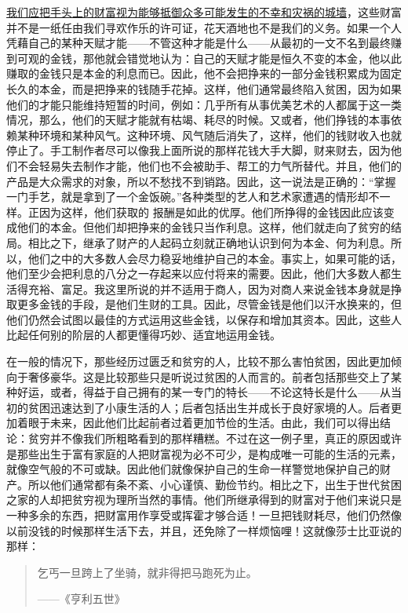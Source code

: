 \documentclass[12pt,oneside]{book}
\begin{document}
\uline{我们应把手头上的财富视为能够抵御众多可能发生的不幸和灾祸的城墙}，这些财富并不是一纸任由我们寻欢作乐的许可证，花天酒地也不是我们的义务。如果一个人凭藉自己的某种天赋才能——不管这种才能是什么——从最初的一文不名到最终赚到可观的金钱，那他就会错觉地认为：自己的天赋才能是恒久不变的本金，他以此赚取的金钱只是本金的利息而已。因此，他不会把挣来的一部分金钱积累成为固定长久的本金，而是把挣来的钱随手花掉。这样，他们通常最终陷入贫困，因为如果他们的才能只能维持短暂的时间，例如：几乎所有从事优美艺术的人都属于这一类情况，那么，他们的天赋才能就有枯竭、耗尽的时候。又或者，他们挣钱的本事依赖某种环境和某种风气。这种环境、风气随后消失了，这样，他们的钱财收入也就停止了。手工制作者尽可以像我上面所说的那样花钱大手大脚，财来财去，因为他们不会轻易失去制作才能，他们也不会被助手、帮工的力气所替代。并且，他们的产品是大众需求的对象，所以不愁找不到销路。因此，这一说法是正确的：“掌握一门手艺，就是拿到了一个金饭碗。”各种类型的艺人和艺术家遭遇的情形却不一样。正因为这样，他们获取的
报酬是如此的优厚。他们所挣得的金钱因此应该变成他们的本金。但他们却把挣来的金钱只当作利息。这样，他们就走向了贫穷的结局。相比之下，继承了财产的人起码立刻就正确地认识到何为本金、何为利息。所以，他们之中的大多数人会尽力稳妥地维护自己的本金。事实上，如果可能的话，他们至少会把利息的八分之一存起来以应付将来的需要。因此，他们大多数人都生活得充裕、富足。我这里所说的并不适用于商人，因为对商人来说金钱本身就是挣取更多金钱的手段，是他们生财的工具。因此，尽管金钱是他们以汗水换来的，但他们仍然会试图以最佳的方式运用这些金钱，以保存和增加其资本。因此，这些人比起任何别的阶层的人都更懂得巧妙、适宜地运用金钱。 

在一般的情况下，那些经历过匮乏和贫穷的人，比较不那么害怕贫困，因此更加倾向于奢侈豪华。这是比较那些只是听说过贫困的人而言的。前者包括那些交上了某种好运，或者，得益于自己拥有的某一专门的特长——不论这特长是什么——从当初的贫困迅速达到了小康生活的人；后者包括出生并成长于良好家境的人。后者更加着眼于未来，因此他们比起前者过着更加节俭的生活。由此，我们可以得出结论：贫穷并不像我们所粗略看到的那样糟糕。不过在这一例子里，真正的原因或许是那些出生于富有家庭的人把财富视为必不可少，是构成唯一可能的生活的元素，就像空气般的不可或缺。因此他们就像保护自己的生命一样警觉地保护自己的财产。所以他们通常都有条不紊、小心谨慎、勤俭节约。相比之下，出生于世代贫困之家的人却把贫穷视为理所当然的事情。他们所继承得到的财富对于他们来说只是一种多余的东西，把财富用作享受或挥霍才够合适！一旦把钱财耗尽，他们仍然像以前没钱的时候那样生活下去，并且，还免除了一样烦恼哩！这就像莎士比亚说的那样： 

 
\begin{quotation}
乞丐一旦跨上了坐骑，就非得把马跑死为止。 

——《亨利五世》 
\end{quotation}
\end{document}
